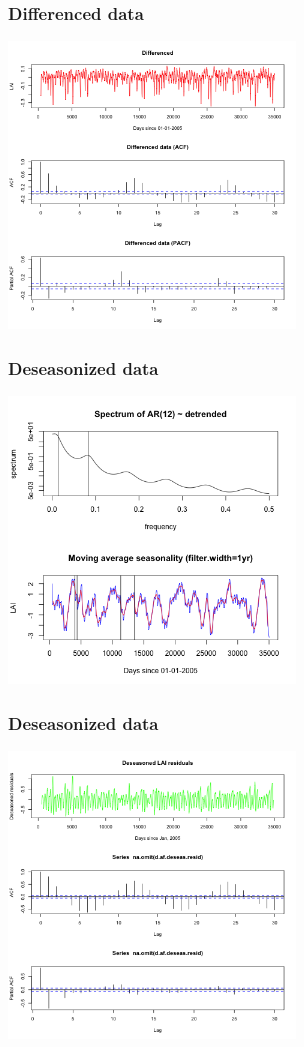 \documentclass{beamer}
\begin{document}
\begin{frame}
\frametitle{Differenced data}
\includegraphics[height=3in]{../img/differenced_acf_pacf.png}
\end{frame}

\begin{frame}
\frametitle{Deseasonized data}
\includegraphics[height=3in]{../img/deseasonalization_spectrum.png}
\end{frame}

\begin{frame}
\frametitle{Deseasonized data}
\includegraphics[height=3in]{../img/deseasonalization_resid.png}
\end{frame}
\end{document}
